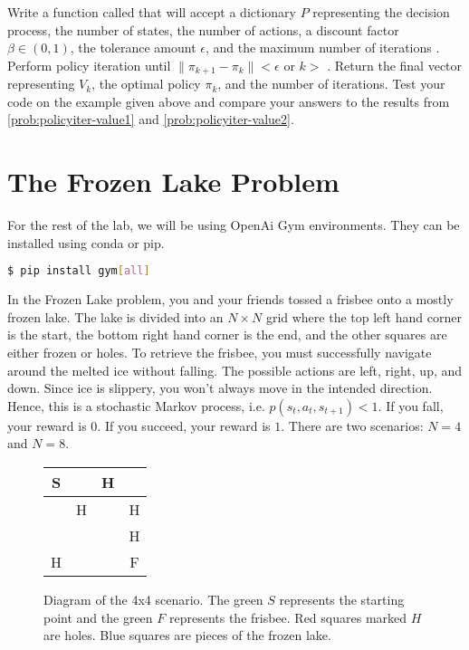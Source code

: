 \begin{problem}
\label{prob:policyiter-value4}
Write a function called  that will accept a dictionary $P$ representing the decision process, the number of states, the number of actions, a discount factor $\beta \in (0,1)$, the tolerance amount $\epsilon$, and the maximum number of iterations .
Perform policy iteration until $\|\pi_{k+1} - \pi_{k}\| < \epsilon$ or $k > $ .
Return the final vector representing $V_k$, the optimal policy $\pi_k$, and the number of iterations.
Test your code on the example given above and compare your answers to the results from \ref{prob:policyiter-value1} and \ref{prob:policyiter-value2}.
\end{problem}



\section*{The Frozen Lake Problem}
For the rest of the lab, we will be using OpenAi Gym environments.
They can be installed using conda or pip.
\begin{lstlisting}[language=Bash]
$ pip install gym[all]
\end{lstlisting}

In the Frozen Lake problem, you and your friends tossed a frisbee onto a mostly frozen lake.
The lake is divided into an $N \times N$ grid where the top left hand corner is the start, the bottom right hand corner is the end, and the other squares are either frozen or holes.
To retrieve the frisbee, you must successfully navigate around the melted ice without falling.
The possible actions are left, right, up, and down.
Since ice is slippery, you won't always move in the intended direction.
Hence, this is a stochastic Markov process, i.e. $p(s_t,a_t,s_{t+1})<1$.
If you fall, your reward is $0$.
If you succeed, your reward is $1$.
There are two scenarios: $N=4$ and $N=8$.

\begin{figure}[H]
\begin{center}
\begin{tabular}{|c|c|c|c|}
\hline
\cellcolor{green!20}S & \cellcolor{blue!20} & \cellcolor{blue!20}\textcolor{blue!20}H & \cellcolor{blue!20} \\ \hline
\cellcolor{blue!20} & \cellcolor{red!20}H & \cellcolor{blue!20} & \cellcolor{red!20}H \\ \hline
\cellcolor{blue!20} & \cellcolor{blue!20} & \cellcolor{blue!20} & \cellcolor{red!20}H \\ \hline
\cellcolor{red!20}H & \cellcolor{blue!20} & \cellcolor{blue!20} & \cellcolor{green!20}F \\ \hline
\end{tabular}
\end{center}
\caption{Diagram of the 4x4 scenario. The green $S$ represents the starting point and the green $F$ represents the frisbee. Red squares marked $H$ are holes. Blue squares are pieces of the frozen lake.}
\label{fig:frozen_lake_4x4}
\end{figure}

